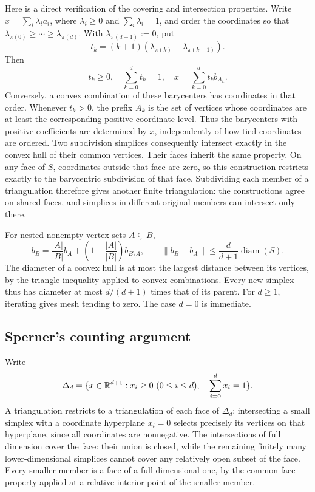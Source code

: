 Here is a direct verification of the covering and intersection
properties. Write \(x=\sum_i\lambda_i a_i\), where
\(\lambda_i\ge0\) and \(\sum_i\lambda_i=1\), and order the
coordinates so that
\(\lambda_{\pi(0)}\ge\cdots\ge\lambda_{\pi(d)}\).
With \(\lambda_{\pi(d+1)}:=0\), put
\[
 t_k=(k+1)(\lambda_{\pi(k)}-\lambda_{\pi(k+1)}).
\]
Then
\[
 t_k\ge0,\quad \sum_{k=0}^d t_k=1,\quad
 x=\sum_{k=0}^d t_k b_{A_k}.
\]
Conversely, a convex combination of these barycenters has coordinates
in that order. Whenever \(t_k>0\), the prefix \(A_k\) is the set of
vertices whose coordinates are at least the corresponding positive
coordinate level. Thus the barycenters with positive coefficients
are determined by \(x\), independently of how tied coordinates are
ordered. Two subdivision simplices consequently intersect exactly
in the convex hull of their common vertices. Their faces inherit the
same property. On any face of \(S\), coordinates outside that face
are zero, so this construction restricts exactly to the barycentric
subdivision of that face. Subdividing each member of a triangulation
therefore gives another finite triangulation: the constructions agree
on shared faces, and simplices in different original members can
intersect only there.

For nested nonempty vertex sets \(A\subsetneq B\),
\[
 b_B=\frac{|A|}{|B|}b_A+
       \left(1-\frac{|A|}{|B|}\right)b_{B\setminus A},
 \qquad
 \|b_B-b_A\|\le\frac{d}{d+1}\operatorname{diam}(S).
\]
The diameter of a convex hull is at most the largest distance between
its vertices, by the triangle inequality applied to convex
combinations. Every new simplex thus has diameter at most
\(d/(d+1)\) times that of its parent. For \(d\ge1\), iterating
gives mesh tending to zero. The case \(d=0\) is immediate.

\subsection{Sperner's counting argument}

Write
\[
 \Delta_d=\{x\in\R^{d+1}:x_i\ge0\ (0\le i\le d),\quad
                                  \sum_{i=0}^d x_i=1\}.
\]
A triangulation restricts to a triangulation of each face of
\(\Delta_d\): intersecting a small simplex with a coordinate
hyperplane \(x_i=0\) selects precisely its vertices on that
hyperplane, since all coordinates are nonnegative. The intersections
of full dimension cover the face: their union is closed, while the
remaining finitely many lower-dimensional simplices cannot cover
any relatively open subset of the face. Every smaller member is a
face of a full-dimensional one, by the common-face property applied
at a relative interior point of the smaller member.

